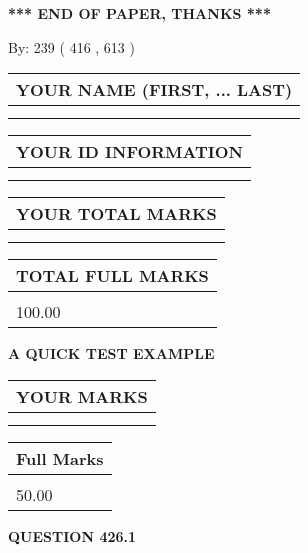 \documentclass[12pt]{article}
\begin{document}
\vspace{1.0in} 
{\textbf{\large{ *** END OF PAPER, THANKS *** }}} 
   
   
\hspace{1.0in} By: 
 239 ( 416 ,  613 )
   
   
   
   
\newpage 
\setcounter{page}{ 
   426001 } 
   
   
   
   
\noindent\begin{tabular}{|l|}
\hline
YOUR NAME (FIRST, ... LAST)  \\
\hline
 \\ 
 \\ 
\hline
\end{tabular}
\hspace{0.05in} \begin{tabular}{|l|}
\hline
 YOUR   ID   INFORMATION  \\
\hline
 \\ 
 \\ 
\hline
\end{tabular}
   
   
\vspace{0.2in}\noindent\begin{tabular}{|l|}
\hline
YOUR TOTAL MARKS  \\
\hline
 \\ 
 \\ 
\hline
\end{tabular}
\hspace{0.05in} \begin{tabular}{|l|}
\hline
TOTAL FULL MARKS  \\
\hline
 \\ 
100.00 \\
\hline
\end{tabular}
   
   
 \vspace{0.2in}
{\LARGE {\textbf{ A QUICK TEST EXAMPLE}}}
   
   
  
\vspace{0.2in}
  
\noindent\begin{tabular}{|l|}
\hline
 YOUR MARKS  \\
\hline
 \\ 
 \\ 
\hline
\end{tabular}
\hspace{0.05in} \begin{tabular}{|l|}
\hline
 Full Marks  \\
\hline
 \\ 
50.00 \\
\hline
\end{tabular}
{\textbf{\Large{QUESTION
426.1 
}}}
  
\end{document}
